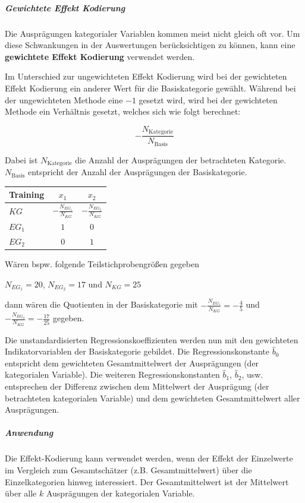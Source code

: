 \documentclass{article}
\numberwithin{equation}{section}
\begin{document}
\subparagraph{Gewichtete Effekt Kodierung}

Die Ausprägungen kategorialer Variablen kommen meist nicht gleich oft vor. Um diese Schwankungen in der Auswertungen berücksichtigen zu können, kann eine \textbf{gewichtete Effekt Kodierung} verwendet werden.

Im Unterschied zur ungewichteten Effekt Kodierung wird bei der gewichteten Effekt Kodierung ein anderer Wert für die Basiskategorie gewählt. Während bei der ungewichteten Methode eine ${-1}$ gesetzt wird, wird bei der gewichteten Methode ein Verhältnis gesetzt, welches sich wie folgt berechnet:

\begin{equation}
-\frac{N_{\text{Kategorie}}}{N_{\text{Basis}}}
\end{equation}

Dabei ist $N_{\text{Kategorie}}$ die Anzahl der Ausprägungen der betrachteten Kategorie. $N_{\text{Basis}}$ entspricht der Anzahl der Ausprägungen der Basiskategorie.

\begin{tabular}{lcc}
Training & $x_1$ & $x_2$\\
\hline
$KG$ & $-\frac{N_{EG_1}}{N_{KG}}$ & $-\frac{N_{EG_2}}{N_{KG}}$\\ 
$EG_1$ & $1$ & $0$\\
$EG_2$ & $0$ & $1$
\end{tabular}

Wären bspw. folgende Teilstichprobengrößen gegeben

$N_{EG_1} = 20$, $N_{EG_2} = 17$ und $N_{KG} = 25$

dann wären die Quotienten in der Basiskategorie mit $-\frac{N_{EG_1}}{N_{KG}} = -\frac{4}{5}$ und $-\frac{N_{EG_2}}{N_{KG}} = -\frac{17}{25}$ gegeben.

Die unstandardisierten Regressionskoeffizienten werden nun mit den gewichteten Indikatorvariablen der Basiskategorie gebildet. Die Regressionskonstante $\hat b_0$ entspricht dem gewichteten Gesamtmittelwert der Ausprägungen (der kategorialen Variable). Die weiteren Regressionskonstanten $\hat b_1$, $\hat b_2$, usw. entsprechen der Differenz zwischen dem Mittelwert der Ausprägung (der betrachteten kategorialen Variable) und dem gewichteten Gesamtmittelwert aller Ausprägungen.

\subparagraph{Anwendung}

Die Effekt-Kodierung kann verwendet werden, wenn der Effekt der Einzelwerte im Vergleich zum Gesamtschätzer (z.B. Gesamtmittelwert) über die Einzelkategorien hinweg interessiert. Der Gesamtmittelwert ist der Mittelwert über alle $k$ Ausprägungen der kategorialen Variable.
\end{document}

